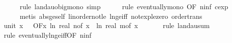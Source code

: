 \begin{isabellebody}
\ \ \ \ \isamarkupfalse%
\ {\isacharparenleft}{\kern0pt}rule\ landau{\isacharunderscore}{\kern0pt}o{\isachardot}{\kern0pt}big{\isacharunderscore}{\kern0pt}mono{\isacharcomma}{\kern0pt}\ simp{\isacharparenright}{\kern0pt}\isanewline
\ \ \ \ \isamarkupfalse%
\ {\isacharparenleft}{\kern0pt}rule\ eventually{\isacharunderscore}{\kern0pt}mono\ {\isacharbrackleft}{\kern0pt}OF\ n{\isacharunderscore}{\kern0pt}inf{\isacharbrackleft}{\kern0pt}\ c{\isacharequal}{\kern0pt}{\isachardoublequoteopen}exp\ {}{\isachardoublequoteclose}{\isacharbrackright}{\kern0pt}{\isacharbrackright}{\kern0pt}{\isacharparenright}{\kern0pt}\ \isanewline
\ \ \ \ \isamarkupfalse%
\ {\isacharparenleft}{\kern0pt}metis\ abs{\isacharunderscore}{\kern0pt}ge{\isacharunderscore}{\kern0pt}self\ linorder{\isacharunderscore}{\kern0pt}not{\isacharunderscore}{\kern0pt}le\ ln{\isacharunderscore}{\kern0pt}ge{\isacharunderscore}{\kern0pt}iff\ not{\isacharunderscore}{\kern0pt}exp{\isacharunderscore}{\kern0pt}le{\isacharunderscore}{\kern0pt}zero\ order{\isachardot}{\kern0pt}trans{\isacharparenright}{\kern0pt}\isanewline
\isanewline
\ \ \isamarkupfalse%
\ unit{\isacharunderscore}{\kern0pt}{}{\isacharcolon}{\kern0pt}\ {\isachardoublequoteopen}{\isacharparenleft}{\kern0pt}{\isasymlambda}x{\isachardot}{\kern0pt}\ {}{\isacharparenright}{\kern0pt}\ {\isasymin}\ O{\isacharbrackleft}{\kern0pt}{\isacharquery}{\kern0pt}F{\isacharbrackright}{\kern0pt}{\isacharparenleft}{\kern0pt}{\isasymlambda}x{\isachardot}{\kern0pt}\ ln\ {\isacharparenleft}{\kern0pt}real\ {\isacharparenleft}{\kern0pt}n{\isacharunderscore}{\kern0pt}of\ x{\isacharparenright}{\kern0pt}{\isacharparenright}{\kern0pt}\ {\isacharplus}{\kern0pt}\ ln\ {\isacharparenleft}{\kern0pt}real\ {\isacharparenleft}{\kern0pt}m{\isacharunderscore}{\kern0pt}of\ x{\isacharparenright}{\kern0pt}{\isacharparenright}{\kern0pt}{\isacharparenright}{\kern0pt}{\isachardoublequoteclose}\ \isanewline
\ \ \ \ \isamarkupfalse%
\ {\isacharparenleft}{\kern0pt}rule\ landau{\isacharunderscore}{\kern0pt}sum{\isacharunderscore}{\kern0pt}{}{\isacharparenright}{\kern0pt}\isanewline
\ \ \ \ \ \ \isamarkupfalse%
\ {\isacharparenleft}{\kern0pt}rule\ eventually{\isacharunderscore}{\kern0pt}ln{\isacharunderscore}{\kern0pt}ge{\isacharunderscore}{\kern0pt}iff{\isacharbrackleft}{\kern0pt}OF\ n{\isacharunderscore}{\kern0pt}inf{\isacharbrackright}{\kern0pt}{\isacharparenright}{\kern0pt}\isanewline
\ \ \ \ \ \isamarkupfalse%

\end{isabellebody}
